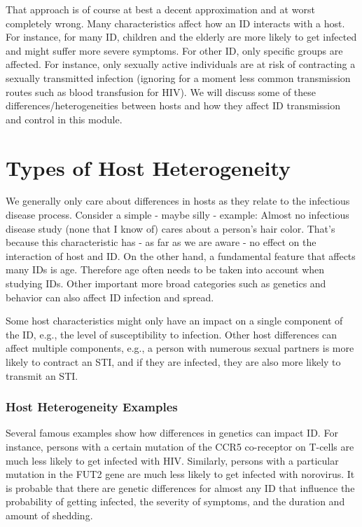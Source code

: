 \documentclass[
]{book}
\begin{document}
That approach is of course at best a decent approximation and at worst completely wrong. Many characteristics affect how an ID interacts with a host. For instance, for many ID, children and the elderly are more likely to get infected and might suffer more severe symptoms. For other ID, only specific groups are affected. For instance, only sexually active individuals are at risk of contracting a sexually transmitted infection (ignoring for a moment less common transmission routes such as blood transfusion for HIV). We will discuss some of these differences/heterogeneities between hosts and how they affect ID transmission and control in this module.

\hypertarget{types-of-host-heterogeneity}{%
\section{Types of Host Heterogeneity}\label{types-of-host-heterogeneity}}

We generally only care about differences in hosts as they relate to the infectious disease process. Consider a simple - maybe silly - example: Almost no infectious disease study (none that I know of) cares about a person's hair color. That's because this characteristic has - as far as we are aware - no effect on the interaction of host and ID. On the other hand, a fundamental feature that affects many IDs is age. Therefore age often needs to be taken into account when studying IDs. Other important more broad categories such as genetics and behavior can also affect ID infection and spread.

Some host characteristics might only have an impact on a single component of the ID, e.g., the level of susceptibility to infection. Other host differences can affect multiple components, e.g., a person with numerous sexual partners is more likely to contract an STI, and if they are infected, they are also more likely to transmit an STI.

\hypertarget{myexamplebox}{%
\subsubsection{Host Heterogeneity Examples}\label{myexamplebox}}

Several famous examples show how differences in genetics can impact ID. For instance, persons with a certain mutation of the CCR5 co-receptor on T-cells are much less likely to get infected with HIV. Similarly, persons with a particular mutation in the FUT2 gene are much less likely to get infected with norovirus. It is probable that there are genetic differences for almost any ID that influence the probability of getting infected, the severity of symptoms, and the duration and amount of shedding.
\end{document}
